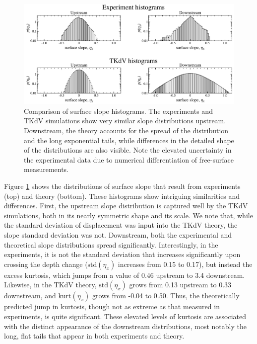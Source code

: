 \documentclass[11pt]{article}
\newcommand{\kurt}{\text{kurt}}
\newcommand{\std}{\text{std}}
\begin{document}
\begin{figure}%
\begin{center}
\includegraphics[width = 0.99 \linewidth]{Figs/slopehist.pdf}
\caption{
Comparison of surface slope histograms. The experiments and TKdV simulations show very similar slope distributions upstream. Downstream, the theory accounts for the spread of the distribution and the long exponential tails, while differences in the detailed shape of the distributions are also visible. Note the elevated uncertainty in the experimental data due to numerical differentiation of free-surface measurements.}
\label{slopehist}
\end{center}
\end{figure}
 
	Figure \ref{slopehist} shows the distributions of surface slope that result from experiments (top) and theory (bottom). These histograms show intriguing similarities and differences. First, the upstream slope distribution is captured well by the TKdV simulations, both in its nearly symmetric shape and its scale. We note that, while the standard deviation of displacement was input into the TKdV theory, the slope standard deviation was not. Downstream, both the experimental and theoretical slope distributions  spread significantly. Interestingly, in the experiments, it is not the standard deviation that increases significantly upon crossing the depth change ($\std(\eta_x)$ increases from 0.15 to 0.17), but instead the excess kurtosis, which jumps from a value of 0.46 upstream to 3.4 downstream. Likewise, in the TKdV theory, $\std(\eta_x)$ grows from 0.13 upstream to 0.33 downstream, and $\kurt(\eta_x)$ grows from -0.04 to 0.50. Thus, the theoretically predicted jump in kurtosis, though not as extreme as that measured in experiments, is quite significant. These elevated levels of kurtosis are associated with the distinct appearance of the downstream distributions, most notably the long, flat tails that appear in both experiments and theory.
 		
\end{document}
